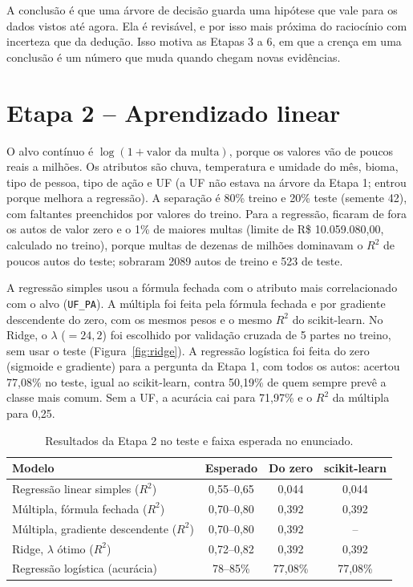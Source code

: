 \documentclass[11pt]{article}
\begin{document}
A conclusão é que uma árvore de decisão guarda uma hipótese que vale para os dados vistos até agora. Ela é revisável, e por isso mais próxima do raciocínio com incerteza que da dedução. Isso motiva as Etapas 3 a 6, em que a crença em uma conclusão é um número que muda quando chegam novas evidências.

\section{Etapa 2 -- Aprendizado linear}
O alvo contínuo é $\log(1+\text{valor da multa})$, porque os valores vão de poucos reais a milhões. Os atributos são chuva, temperatura e umidade do mês, bioma, tipo de pessoa, tipo de ação e UF (a UF não estava na árvore da Etapa 1; entrou porque melhora a regressão). A separação é 80\% treino e 20\% teste (semente 42), com faltantes preenchidos por valores do treino. Para a regressão, ficaram de fora os autos de valor zero e o 1\% de maiores multas (limite de R\$ 10.059.080,00, calculado no treino), porque multas de dezenas de milhões dominavam o $R^2$ de poucos autos do teste; sobraram 2089 autos de treino e 523 de teste.

A regressão simples usou a fórmula fechada com o atributo mais correlacionado com o alvo (\texttt{UF\_PA}). A múltipla foi feita pela fórmula fechada e por gradiente descendente do zero, com os mesmos pesos e o mesmo $R^2$ do scikit-learn. No Ridge, o $\lambda$ ($=24{,}2$) foi escolhido por validação cruzada de 5 partes no treino, sem usar o teste (Figura~\ref{fig:ridge}). A regressão logística foi feita do zero (sigmoide e gradiente) para a pergunta da Etapa 1, com todos os autos: acertou 77,08\% no teste, igual ao scikit-learn, contra 50,19\% de quem sempre prevê a classe mais comum. Sem a UF, a acurácia cai para 71,97\% e o $R^2$ da múltipla para 0,25.

\begin{table}[H]
\centering
\small
\begin{tabular}{lccc}
\toprule
Modelo & Esperado & Do zero & scikit-learn \\
\midrule
Regressão linear simples ($R^2$) & 0,55--0,65 & 0,044 & 0,044 \\
Múltipla, fórmula fechada ($R^2$) & 0,70--0,80 & 0,392 & 0,392 \\
Múltipla, gradiente descendente ($R^2$) & 0,70--0,80 & 0,392 & -- \\
Ridge, $\lambda$ ótimo ($R^2$) & 0,72--0,82 & 0,392 & 0,392 \\
Regressão logística (acurácia) & 78--85\% & 77,08\% & 77,08\% \\
\bottomrule
\end{tabular}
\caption{Resultados da Etapa 2 no teste e faixa esperada no enunciado.}
\label{tab:etapa2}
\end{table}
\end{document}
